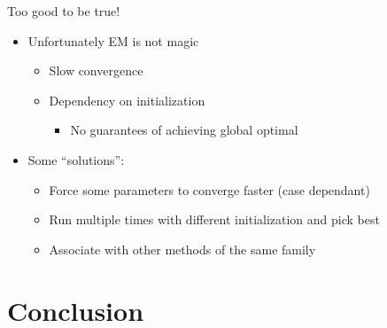 \documentclass[aspectratio=169]{beamer}
\begin{document}


\begin{frame}{Too good to be true!}{}
  \begin{itemize}[<+(1)->]
    \item Unfortunately EM is not magic
          \begin{itemize}
            \item Slow convergence
            \item Dependency on initialization
                  \begin{itemize}
                    \item No guarantees of achieving global optimal
                  \end{itemize}
          \end{itemize}
    \item Some ``solutions'':
          \begin{itemize}
            \item Force some parameters to converge faster (case dependant)
            \item Run multiple times with different initialization and pick best
            \item Associate with other methods of the same family
          \end{itemize}
  \end{itemize}
\end{frame}

\section{Conclusion}
\end{document}
